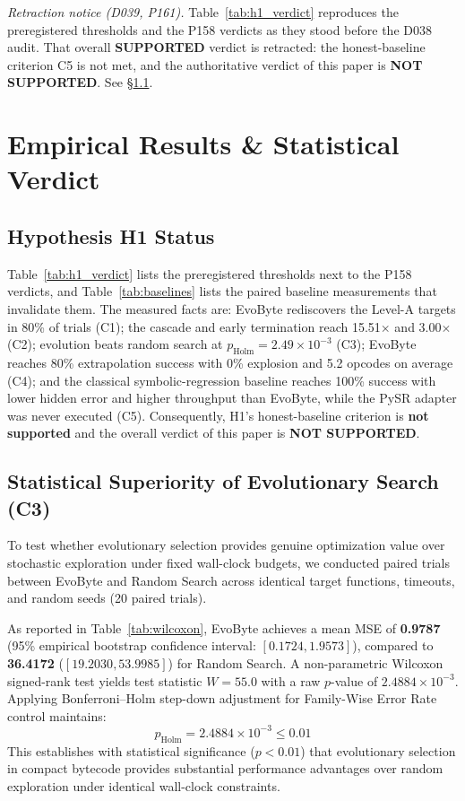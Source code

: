 \documentclass[11pt,a4paper]{article}
\begin{document}
\noindent\emph{Retraction notice (D039, P161).} Table~\ref{tab:h1_verdict} reproduces the
preregistered thresholds and the P158 verdicts as they stood before the D038 audit. That
overall \textbf{SUPPORTED} verdict is retracted: the honest-baseline criterion C5 is not met,
and the authoritative verdict of this paper is \textbf{NOT SUPPORTED}. See
\S\ref{sec:h1-status}.

\section{Empirical Results \& Statistical Verdict}

\subsection{Hypothesis H1 Status}
\label{sec:h1-status}
Table~\ref{tab:h1_verdict} lists the preregistered thresholds next to the P158 verdicts, and
Table~\ref{tab:baselines} lists the paired baseline measurements that invalidate them. The
measured facts are: EvoByte rediscovers the Level-A targets in 80\% of trials (C1); the cascade
and early termination reach 15.51$\times$ and 3.00$\times$ (C2); evolution beats random search
at $p_{\text{Holm}} = 2.49 \times 10^{-3}$ (C3); EvoByte reaches 80\% extrapolation success with
0\% explosion and 5.2 opcodes on average (C4); and the classical symbolic-regression baseline
reaches 100\% success with lower hidden error and higher throughput than EvoByte, while the PySR
adapter was never executed (C5). Consequently, H1's honest-baseline criterion is
\textbf{not supported} and the overall verdict of this paper is \textbf{NOT SUPPORTED}.

\subsection{Statistical Superiority of Evolutionary Search (C3)}
To test whether evolutionary selection provides genuine optimization value over stochastic exploration under fixed wall-clock budgets, we conducted paired trials between EvoByte and Random Search across identical target functions, timeouts, and random seeds (20 paired trials).



As reported in Table~\ref{tab:wilcoxon}, EvoByte achieves a mean MSE of \textbf{0.9787} (95\% empirical bootstrap confidence interval: $[0.1724, 1.9573]$), compared to \textbf{36.4172} ($[19.2030, 53.9985]$) for Random Search. A non-parametric Wilcoxon signed-rank test yields test statistic $W = 55.0$ with a raw $p$-value of $2.4884 \times 10^{-3}$. Applying Bonferroni--Holm step-down adjustment for Family-Wise Error Rate control maintains:
\begin{equation}
    p_{\text{Holm}} = 2.4884 \times 10^{-3} \le 0.01
\end{equation}
This establishes with statistical significance ($p < 0.01$) that evolutionary selection in compact bytecode provides substantial performance advantages over random exploration under identical wall-clock constraints.
\end{document}
